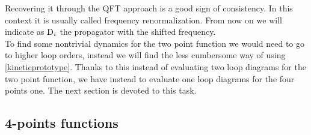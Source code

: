 Recovering it through the QFT approach is a good sign of consistency. In this context it is usually called frequency renormalization. From now on we will indicate
as $\mathrm{D}_i$ the propagator with the shifted frequency.\\  
To find some nontrivial dynamics for the two point function we would need to go to higher loop orders, instead we will find the less cumbersome way of using 
\eqref{kineticprototype}. Thanks to this instead of evaluating two loop diagrams for the two point function, we have instead to evaluate one loop diagrams for the 
four points one. The next section is devoted to this task.\\  
\subsection{4-points functions}

